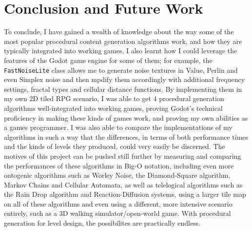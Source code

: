 \chapter{Conclusion and Future Work}


To conclude, I have gained a wealth of knowledge about the way some of the most popular procedural content generation algorithms work, and how they are typically integrated into working games. I also learnt how I could leverage the features of the Godot game engine for some of them; for example, the \verb|FastNoiseLite| class allows me to generate noise textures in Value, Perlin and even Simplex noise and then mpdify them accordingly with additional frequency settings, fractal types and cellular distance functions. By implementing them in my own 2D tiled RPG scenario, I was able to get 4 procedural generation algorithms well-integrated into working games, proving Godot's technical proficiency in making these kinds of games work, and proving my own abilities as a games programmer. I was also able to compare the implementations of my algorithms in such a way that the differences, in terms of both performance times and the kinds of levels they produced, could very easily be discerned. The motives of this project can be pushed still further by measuring and comparing the performances of these algorithms in Big-O notation, including even more ontogenic algorithms such as Worley Noise, the Diamond-Square algorithm, Markov Chains and Cellular Automata, as well as telelogical algorithms such as the Rain Drop algorithm and Reaction-Diffusion systems, using a larger tile map on all of these algorithms and even using a different, more intensive scenario entirely, such as a 3D walking simulator/open-world game. With procedural generation for level design, the possibilites are practically endless.